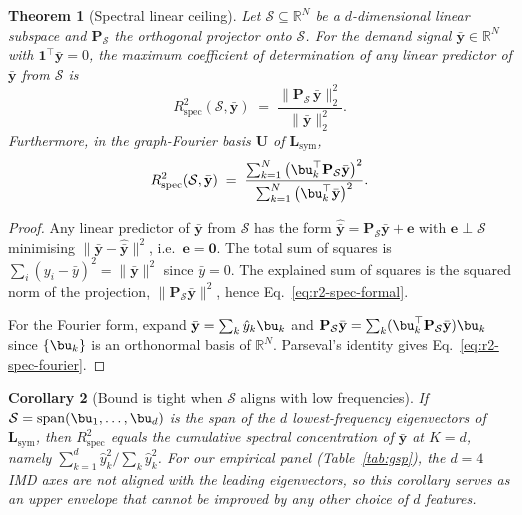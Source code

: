 \documentclass[11pt,a4paper]{article}
\newcommand{\1}{\mathbb{1}}
\newcommand{\bU}{\mathbf{U}}
\newcommand{\bP}{\mathbf{P}}
\newcommand{\bz}{\mathbf{0}}
\newcommand{\bone}{\mathbf{1}}
\newcommand{\by}{\bar{\mathbf{y}}}
\newcommand{\Lsym}{\mathbf{L}_{\mathrm{sym}}}
\theoremstyle{plain}
\newtheorem{theorem}{Theorem}
\newtheorem{corollary}[theorem]{Corollary}
\theoremstyle{definition}
\theoremstyle{remark}
\begin{document}
\begin{theorem}[Spectral linear ceiling]
\label{thm:projection}
Let $\mathcal{S} \subseteq \mathbb{R}^N$ be a $d$-dimensional
linear subspace and $\bP_\mathcal{S}$ the orthogonal projector
onto $\mathcal{S}$.  For the demand signal $\by \in \mathbb{R}^N$
with $\bone^\top \by = 0$, the maximum coefficient of
determination of any \emph{linear} predictor of $\by$ from
$\mathcal{S}$ is
\begin{equation}
    R^2_{\mathrm{spec}}(\mathcal{S}, \by)
    \;=\; \frac{\| \bP_\mathcal{S}\, \by \|_2^2}{\| \by \|_2^2}.
    \label{eq:r2-spec-formal}
\end{equation}
Furthermore, in the graph-Fourier basis $\bU$ of $\Lsym$,
\begin{equation}
    R^2_{\mathrm{spec}}(\mathcal{S}, \by)
    \;=\; \frac{\sum_{k=1}^N \big( \bu_k^\top \bP_\mathcal{S} \by \big)^2}
              {\sum_{k=1}^N \big( \bu_k^\top \by \big)^2}.
    \label{eq:r2-spec-fourier}
\end{equation}
\end{theorem}

\begin{proof}
Any linear predictor of $\by$ from $\mathcal{S}$ has the form
$\hat\by = \bP_\mathcal{S} \by + \mathbf{e}$ with
$\mathbf{e} \perp \mathcal{S}$ minimising
$\|\by - \hat\by\|^2$, i.e.\ $\mathbf{e} = \bz$.  The
total sum of squares is $\sum_i (y_i - \bar y)^2 = \|\by\|^2$
since $\bar y = 0$.  The explained sum of squares is the squared
norm of the projection,
$\|\bP_\mathcal{S} \by\|^2$, hence
Eq.~\eqref{eq:r2-spec-formal}.

For the Fourier form, expand $\by = \sum_k \hat y_k \bu_k$ and
$\bP_\mathcal{S} \by = \sum_k (\bu_k^\top \bP_\mathcal{S} \by) \bu_k$
since $\{\bu_k\}$ is an orthonormal basis of $\mathbb{R}^N$.
Parseval's identity gives Eq.~\eqref{eq:r2-spec-fourier}.
\end{proof}

\begin{corollary}[Bound is tight when $\mathcal{S}$ aligns with low frequencies]
\label{cor:tight-bound}
If $\mathcal{S} = \mathrm{span}(\bu_1, \ldots, \bu_d)$ is the
span of the $d$ lowest-frequency eigenvectors of $\Lsym$, then
$R^2_{\mathrm{spec}}$ equals the cumulative spectral concentration
of $\by$ at $K = d$, namely
$\sum_{k=1}^d \hat y_k^2 / \sum_k \hat y_k^2$.  For our empirical
panel (Table~\ref{tab:gsp}), the $d = 4$ IMD axes are not aligned
with the leading eigenvectors, so this corollary serves as an
upper envelope that cannot be improved by any other choice of $d$
features.
\end{corollary}
\end{document}
